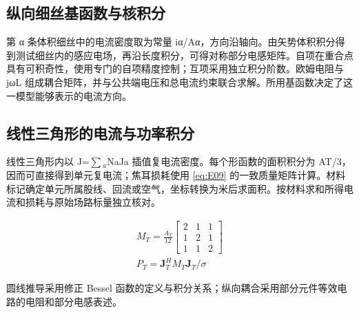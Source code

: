 \hypertarget{S1.peec_derivation.heading}{}
\subsection{纵向细丝基函数与核积分}

\hypertarget{S1.peec_derivation.p1}{}
第 α 条体积细丝中的电流密度取为常量 iα/Aα，方向沿轴向。由矢势体积积分得到测试细丝内的感应电场，再沿长度积分，可得对称部分电感矩阵。自项在重合点具有可积奇性，使用专门的自项精度控制；互项采用独立积分阶数。欧姆电阻与 jωL 组成耦合矩阵，并与公共端电压和总电流约束联合求解。所用基函数决定了这一模型能够表示的电流方向。

\hypertarget{S1.triangle_derivation.heading}{}
\subsection{线性三角形的电流与功率积分}

\hypertarget{S1.triangle_derivation.p1}{}
线性三角形内以 J=\(\sum\)\(_a\)NaJa 插值复电流密度。每个形函数的面积积分为 AT/3，因而可直接得到单元复电流；焦耳损耗使用 \eqref{eq:E09} 的一致质量矩阵计算。材料标记确定单元所属股线、回流或空气，坐标转换为米后求面积。按材料求和所得电流和损耗与原始场路标量独立核对。

\hypertarget{S1.equation.E09}{}
\hypertarget{E09}{}
\begin{equation}
\begin{gathered}
M_T=\frac{A_T}{12}\begin{bmatrix}2&1&1\\1&2&1\\1&1&2\end{bmatrix} \\
P_T=\mathbf J_T^H M_T\mathbf J_T/\sigma
\end{gathered}
\tag{8}\label{eq:E09}
\end{equation}

\hypertarget{S1.method.sources}{}
圆线推导采用修正 Bessel 函数的定义与积分关系；纵向耦合采用部分元件等效电路的电阻和部分电感表述。\cite{BESSEL,RUEHLI1974}

